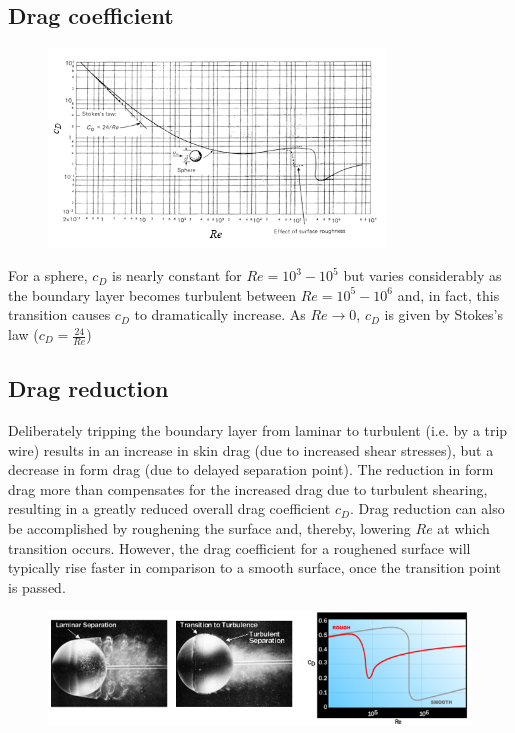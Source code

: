 \documentclass[class=report, crop=false, 12pt,a4paper]{standalone}
\begin{document}
\subsection{Drag coefficient}
\begin{figure}[H]
  \centering
  \includegraphics[width = 0.8\textwidth]{../img/diagram58.png}
\end{figure}
For a sphere, $c_D$ is nearly constant for $Re = 10^3 - 10^5$ but varies considerably as the boundary layer becomes turbulent between $Re = 10^5 - 10^6$ and, in fact, this transition causes $c_D$ to dramatically increase. As $Re \rightarrow 0$, $c_D$ is given by Stokes's law ($c_D = \frac{24}{Re}$)
\subsection{Drag reduction}
Deliberately tripping the boundary layer from laminar to turbulent (i.e. by a trip wire) results in an increase in skin drag (due to increased shear stresses), but a decrease in form drag (due to delayed separation point). The reduction in form drag more than compensates for the increased drag due to turbulent shearing, resulting in a greatly reduced overall drag coefficient $c_D$. Drag reduction can also be accomplished by roughening the surface and, thereby, lowering $Re$ at which transition occurs. However, the drag coefficient for a roughened surface will typically rise faster in comparison to a smooth surface, once the transition point is passed. 
\begin{figure}[H]
  \centering
  \includegraphics[width = \textwidth]{../img/diagram59.png}
\end{figure}
\end{document}
